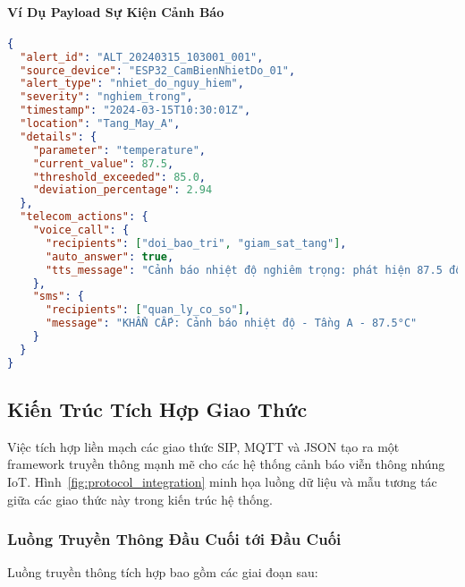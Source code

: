 \paragraph{Ví Dụ Payload Sự Kiện Cảnh Báo}
\begin{lstlisting}[language=json, caption=Payload Sự Kiện Cảnh Báo cho Hành Động Viễn Thông, label=lst:alert_payload]
{
  "alert_id": "ALT_20240315_103001_001",
  "source_device": "ESP32_CamBienNhietDo_01",
  "alert_type": "nhiet_do_nguy_hiem",
  "severity": "nghiem_trong",
  "timestamp": "2024-03-15T10:30:01Z",
  "location": "Tang_May_A",
  "details": {
    "parameter": "temperature",
    "current_value": 87.5,
    "threshold_exceeded": 85.0,
    "deviation_percentage": 2.94
  },
  "telecom_actions": {
    "voice_call": {
      "recipients": ["doi_bao_tri", "giam_sat_tang"],
      "auto_answer": true,
      "tts_message": "Cảnh báo nhiệt độ nghiêm trọng: phát hiện 87.5 độ C tại Tầng Máy A"
    },
    "sms": {
      "recipients": ["quan_ly_co_so"],
      "message": "KHẨN CẤP: Cảnh báo nhiệt độ - Tầng A - 87.5°C"
    }
  }
}
\end{lstlisting}
\subsection{Kiến Trúc Tích Hợp Giao Thức}
\label{subsec:protocol_integration}

Việc tích hợp liền mạch các giao thức SIP, MQTT và JSON tạo ra một framework truyền thông mạnh mẽ cho các hệ thống cảnh báo viễn thông nhúng IoT. Hình~\ref{fig:protocol_integration} minh họa luồng dữ liệu và mẫu tương tác giữa các giao thức này trong kiến trúc hệ thống.


\subsubsection{Luồng Truyền Thông Đầu Cuối tới Đầu Cuối}
\label{subsubsec:e2e_communication}

Luồng truyền thông tích hợp bao gồm các giai đoạn sau:

